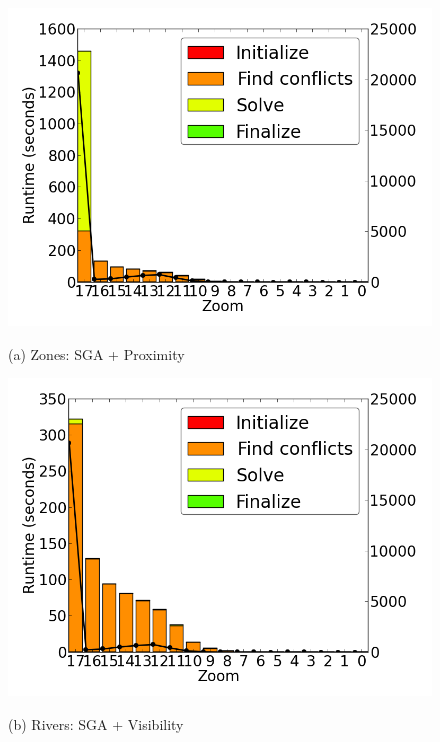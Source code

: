 \begin{figure}[tb]
  \begin{minipage}{0.329\linewidth}
    \centerline{\includegraphics[width=1.0\linewidth]{./figs/prelim_pol_30k_dai_lp_A.png}}
    \centerline{(a) Zones: SGA + Proximity}
  \end{minipage} \hfill
  \begin{minipage}{0.329\linewidth}
    \centerline{\includegraphics[width=1.0\linewidth]{./figs/prelim_pol_30k_dai_heuristic_A.png}}
    \centerline{(b) Rivers: SGA + Visibility}
  \end{minipage} \hfill
  \begin{minipage}{0.329\linewidth}

\end{minipage}
\end{figure}

